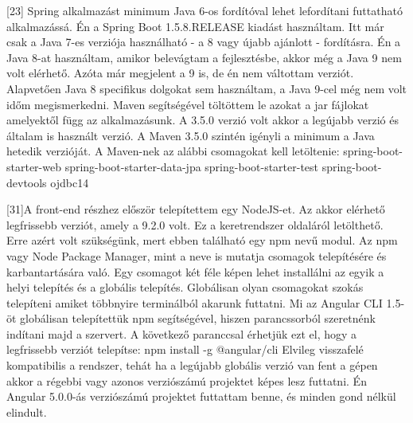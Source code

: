 




[23] Spring alkalmazást minimum Java 6-os fordítóval lehet lefordítani futtatható alkalmazássá. Én a Spring Boot 1.5.8.RELEASE kiadást használtam. Itt már csak a Java 7-es verziója használható - a 8 vagy újabb ajánlott - fordításra. Én a Java 8-at használtam, amikor belevágtam a fejlesztésbe, akkor még a Java 9 nem volt elérhető. Azóta már megjelent a 9 is, de én nem váltottam verziót. Alapvetően Java 8 specifikus dolgokat sem használtam, a Java 9-cel még nem volt időm megismerkedni.
Maven segítségével töltöttem le azokat a jar fájlokat amelyektől függ az alkalmazásunk. A 3.5.0 verzió volt akkor a legújabb verzió és általam is használt verzió. A Maven 3.5.0 szintén igényli a minimum a Java hetedik verzióját.
A Maven-nek az alábbi csomagokat kell letöltenie: 
spring-boot-starter-web
spring-boot-starter-data-jpa
spring-boot-starter-test
spring-boot-devtools
ojdbc14 %

[31]A front-end részhez először telepítettem egy NodeJS-et. Az akkor elérhető legfrissebb verziót, amely a 9.2.0 volt. Ez a keretrendszer oldaláról letölthető. Erre azért volt szükségünk, mert ebben található egy npm nevű modul. Az npm vagy Node Package Manager, mint a neve is mutatja csomagok telepítésére és karbantartására való.
Egy csomagot két féle képen lehet installálni az egyik a helyi telepítés és a globális telepítés. Globálisan olyan csomagokat szokás telepíteni amiket többnyire terminálból akarunk futtatni.
Mi az Angular CLI 1.5-öt globálisan telepítettük npm segítségével, hiszen parancssorból szeretnénk indítani majd a szervert.
A következő paranccsal érhetjük ezt el, hogy a legfrissebb verziót telepítse: npm install -g @angular/cli
Elvileg visszafelé kompatibilis a rendszer, tehát ha a legújabb globális verzió van fent a gépen akkor a régebbi vagy azonos verziószámú projektet képes lesz futtatni. Én Angular 5.0.0-ás verziószámú projektet futtattam benne, és minden gond nélkül elindult.